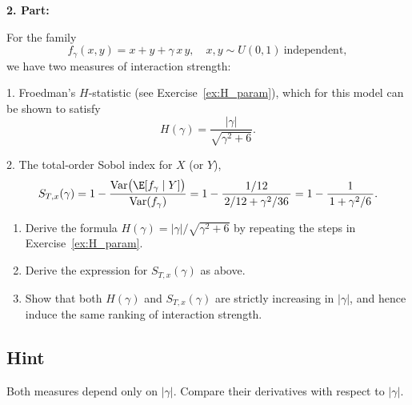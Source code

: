 {\textbf{2. Part:}

For the family
\[
f_\gamma(x,y)=x + y + \gamma\,x\,y,
\quad
x,y\sim U(0,1)\ \text{independent},
\]
we have two measures of interaction strength:

1. Froedman’s $H$‐statistic (see Exercise~\ref{ex:H_param}), which for this model
   can be shown to satisfy
   \[
   H(\gamma) = \frac{|\gamma|}{\sqrt{\gamma^2 + 6}}.
   \]

2. The total‐order Sobol index for $X$ (or $Y$),
   \[
   S_{T,x}(\gamma)
   = 1 - \frac{\text{Var}\bigl(\E[f_\gamma\mid Y]\bigr)}{\text{Var}(f_\gamma)}
   = 1 - \frac{1/12}{\,2/12 + \gamma^2/36\,}
   = 1 - \frac{1}{\,1 + \gamma^2/6\,}.
   \]

\begin{enumerate}%
  \item Derive the formula $H(\gamma)=|\gamma|/\sqrt{\gamma^2+6}$ by
        repeating the steps in Exercise~\ref{ex:H_param}.
  \item Derive the expression for $S_{T,x}(\gamma)$ as above.
  \item Show that both $H(\gamma)$ and $S_{T,x}(\gamma)$ are strictly
        increasing in $|\gamma|$, and hence induce the same ranking of
        interaction strength.
\end{enumerate}

\subsection*{Hint}
Both measures depend only on $|\gamma|$.  Compare their derivatives
with respect to $|\gamma|$.

}